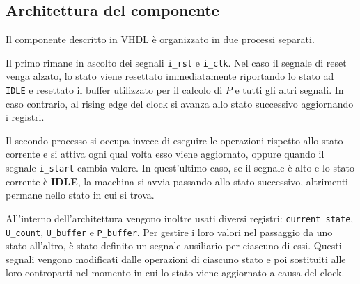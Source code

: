 \subsection{Architettura del componente}

Il componente descritto in VHDL è organizzato in due processi separati.

Il primo rimane in ascolto dei segnali \verb|i_rst| e \verb|i_clk|. Nel caso il segnale di reset venga alzato, lo stato viene resettato immediatamente riportando lo stato ad \verb|IDLE| e resettato il buffer utilizzato per il calcolo di $P$ e tutti gli altri segnali. In caso contrario, al rising edge del clock si avanza allo stato successivo aggiornando i registri.

Il secondo processo si occupa invece di eseguire le operazioni rispetto allo stato corrente e si attiva ogni qual volta esso viene aggiornato, oppure quando il segnale \verb|i_start| cambia valore. In quest'ultimo caso, se il segnale è alto e lo stato corrente è \textbf{IDLE}, la macchina si avvia passando allo stato successivo, altrimenti permane nello stato in cui si trova.

All'interno dell'architettura vengono inoltre usati diversi registri: \verb|current_state|, \verb|U_count|, \verb|U_buffer| e \verb|P_buffer|. Per gestire i loro valori nel passaggio da uno stato all'altro, è stato definito un segnale ausiliario per ciascuno di essi. Questi segnali vengono modificati dalle operazioni di ciascuno stato e poi sostituiti alle loro controparti nel momento in cui lo stato viene aggiornato a causa del clock.